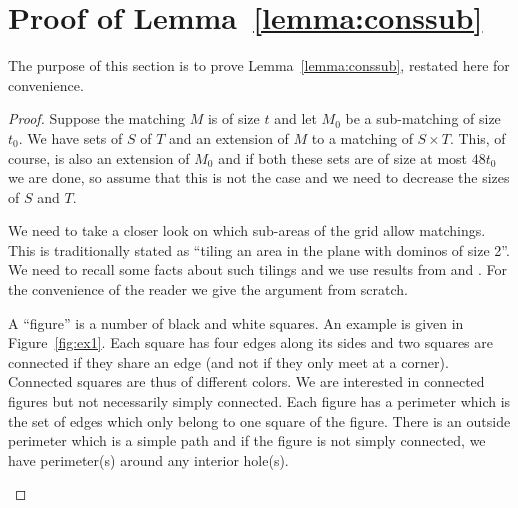 \documentclass{theoretics}
\begin{document}
\printbibliography

\newpage
\appendix

\section{Proof of Lemma~\ref{lemma:conssub}} \label{sec:proof}

The purpose of this section is to prove Lemma~\ref{lemma:conssub}, restated
here for convenience.

\Conslemma*

\begin{proof}
Suppose the matching $M$ is of size $t$ and
let $M_0$ be a sub-matching of size $t_0$.  We have
sets of $S$ of $T$ and an extension
of $M$ to a matching of $S \times T$.  This,
of course, is also an extension of $M_0$ and if both these
sets are of size at most $48t_0$ we are done,
so assume that this is not the case and we need
to decrease the sizes of $S$ and $T$.

We need to take a
closer look on which sub-areas of the grid allow
matchings.  This is traditionally stated
as ``tiling an area in the plane with dominos of size 2''.
We need to recall some facts about such tilings
and we use results from \cite{thiant} and \cite{fournier}.
For the convenience of the reader we give the argument
from scratch.   

A ``figure'' is a number of black
and white squares.  An example is given in Figure~\ref{fig:ex1}.
Each square has four edges
along its sides and two squares are connected 
if they share an edge (and not if they only
meet at a corner).  Connected squares are thus of
different colors.  We are interested in connected
figures but not necessarily simply connected.
Each figure has a perimeter which is the set of edges
which only belong to one square of the figure.
There is an outside perimeter which is a simple path and
if the figure is not simply connected, we have
perimeter(s) around any interior hole(s).

\medskip
\begin{figure}[h]
\begin{center}
\end{center}
\end{figure}
\end{proof}
\end{document}
